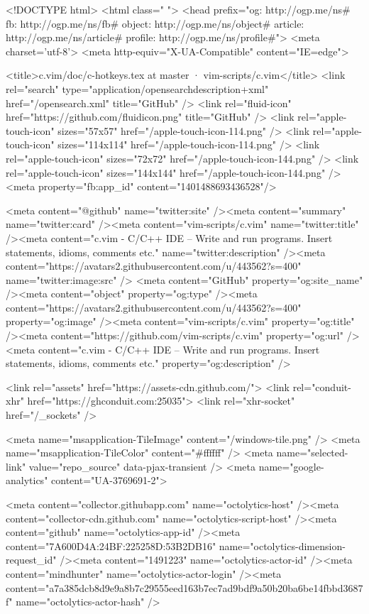 




<!DOCTYPE html>
<html class="   ">
  <head prefix="og: http://ogp.me/ns# fb: http://ogp.me/ns/fb# object: http://ogp.me/ns/object# article: http://ogp.me/ns/article# profile: http://ogp.me/ns/profile#">
    <meta charset='utf-8'>
    <meta http-equiv="X-UA-Compatible" content="IE=edge">
    
    
    <title>c.vim/doc/c-hotkeys.tex at master · vim-scripts/c.vim</title>
    <link rel="search" type="application/opensearchdescription+xml" href="/opensearch.xml" title="GitHub" />
    <link rel="fluid-icon" href="https://github.com/fluidicon.png" title="GitHub" />
    <link rel="apple-touch-icon" sizes="57x57" href="/apple-touch-icon-114.png" />
    <link rel="apple-touch-icon" sizes="114x114" href="/apple-touch-icon-114.png" />
    <link rel="apple-touch-icon" sizes="72x72" href="/apple-touch-icon-144.png" />
    <link rel="apple-touch-icon" sizes="144x144" href="/apple-touch-icon-144.png" />
    <meta property="fb:app_id" content="1401488693436528"/>

      <meta content="@github" name="twitter:site" /><meta content="summary" name="twitter:card" /><meta content="vim-scripts/c.vim" name="twitter:title" /><meta content="c.vim - C/C++ IDE --  Write and run programs. Insert statements, idioms, comments etc." name="twitter:description" /><meta content="https://avatars2.githubusercontent.com/u/443562?s=400" name="twitter:image:src" />
<meta content="GitHub" property="og:site_name" /><meta content="object" property="og:type" /><meta content="https://avatars2.githubusercontent.com/u/443562?s=400" property="og:image" /><meta content="vim-scripts/c.vim" property="og:title" /><meta content="https://github.com/vim-scripts/c.vim" property="og:url" /><meta content="c.vim - C/C++ IDE --  Write and run programs. Insert statements, idioms, comments etc." property="og:description" />

    <link rel="assets" href="https://assets-cdn.github.com/">
    <link rel="conduit-xhr" href="https://ghconduit.com:25035">
    <link rel="xhr-socket" href="/_sockets" />

    <meta name="msapplication-TileImage" content="/windows-tile.png" />
    <meta name="msapplication-TileColor" content="#ffffff" />
    <meta name="selected-link" value="repo_source" data-pjax-transient />
      <meta name="google-analytics" content="UA-3769691-2">

    <meta content="collector.githubapp.com" name="octolytics-host" /><meta content="collector-cdn.github.com" name="octolytics-script-host" /><meta content="github" name="octolytics-app-id" /><meta content="7A600D4A:24BF:225258D:53B2DB16" name="octolytics-dimension-request_id" /><meta content="1491223" name="octolytics-actor-id" /><meta content="mindhunter" name="octolytics-actor-login" /><meta content="a7a385dcb8d9e9a8b7c29555eed163b7ec7ad9bdf9a50b20ba6be14fbbd3687f" name="octolytics-actor-hash" />
    

